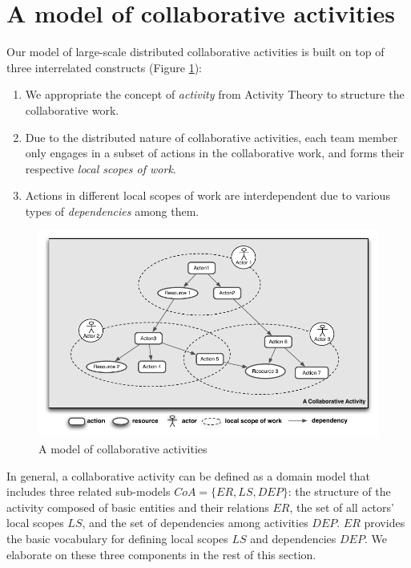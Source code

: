 \section{A model of collaborative activities} %
\label{sec:a_model_of_collaborative_activities}
Our model of large-scale distributed collaborative activities is built on top of three interrelated constructs (Figure \ref{fig:model_of_collaborative_activity}):

\begin{enumerate}
	\item We appropriate the concept of \emph{activity} from Activity Theory \cite{nardi1996context} to structure the collaborative work.
	\item Due to the distributed nature of collaborative activities, each team member only engages in a subset of actions in the collaborative work, and forms their respective \emph{local scopes of work}.
	\item Actions in different local scopes of work are interdependent due to various types of \emph{dependencies} among them.
\end{enumerate}

\begin{figure}[htbp] %
   \centering
   \includegraphics{model_of_collaborative_activity.pdf} 
   \caption{A model of collaborative activities}
   \label{fig:model_of_collaborative_activity}
\end{figure}

In general, a collaborative activity can be defined as a domain model that includes three related sub-models $CoA=\{ER, LS, DEP\}$: the structure of the activity composed of basic entities and their relations $ER$, the set of all actors' local scopes $LS$, and the set of dependencies among activities $DEP$. $ER$ provides the basic vocabulary for defining local scopes $LS$ and dependencies $DEP$. We elaborate on these three components in the rest of this section. 

